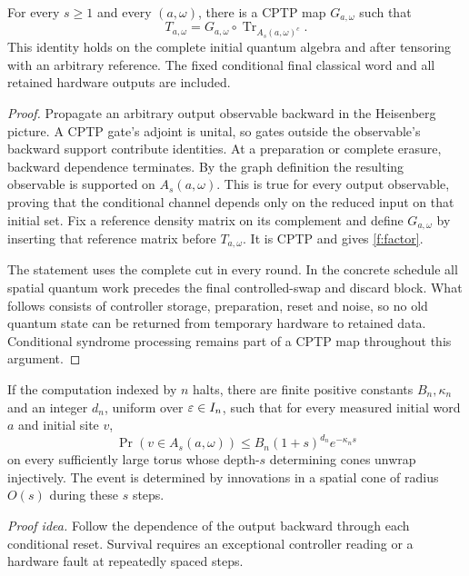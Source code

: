 \begin{lemma}\label{f:factorization}
For every \(s\ge1\) and every \((a,\omega)\), there is a CPTP map \(G_{a,\omega}\) such
that
\begin{equation}\label{f:factor}
 T_{a,\omega}
 =G_{a,\omega}\circ
   \operatorname{Tr}_{A_s(a,\omega)^c}.
\end{equation}
This identity holds on the complete initial quantum algebra and after
tensoring with an arbitrary reference. The fixed conditional final
classical word and all retained hardware outputs are included.
\end{lemma}
\begin{proof}
Propagate an arbitrary output observable backward in the Heisenberg
picture. A CPTP gate's adjoint is unital, so gates outside the
observable's backward support contribute identities. At a
preparation or complete erasure, backward dependence terminates.
By the graph definition the resulting observable is supported on
\(A_s(a,\omega)\). This is true for every output observable, proving
that the conditional channel depends only on the reduced input on
that initial set. Fix a reference density matrix on its complement
and define \(G_{a,\omega}\) by inserting that reference matrix before
\(T_{a,\omega}\). It is CPTP and gives \eqref{f:factor}.

The statement uses the complete cut in every round. In the
concrete schedule all spatial quantum work precedes the final
controlled-swap and discard block. What follows consists of controller
storage, preparation, reset and noise, so no old quantum state can
be returned from temporary hardware to retained data. Conditional
syndrome processing remains part of a CPTP map throughout this
argument.
\end{proof}

\begin{proposition}\label{f:ancestor}
If the computation indexed by \(n\) halts, there are finite positive
constants \(B_n,\kappa_n\) and an integer \(d_n\), uniform over
\(\varepsilon\in I_n\), such that for every measured initial word \(a\)
and initial site \(v\),
\begin{equation}\label{f:ancestor-tail}
 \Pr(v\in A_s(a,\omega))
 \le B_n(1+s)^{d_n}e^{-\kappa_ns}
\end{equation}
on every sufficiently large torus whose depth-\(s\) determining cones
unwrap injectively. The event is determined by innovations in a
spatial cone of radius \(O(s)\) during these \(s\) steps.
\end{proposition}
\par\noindent\emph{Proof idea.} Follow the dependence of the output backward through each conditional reset. Survival requires an exceptional controller reading or a hardware fault at repeatedly spaced steps.

